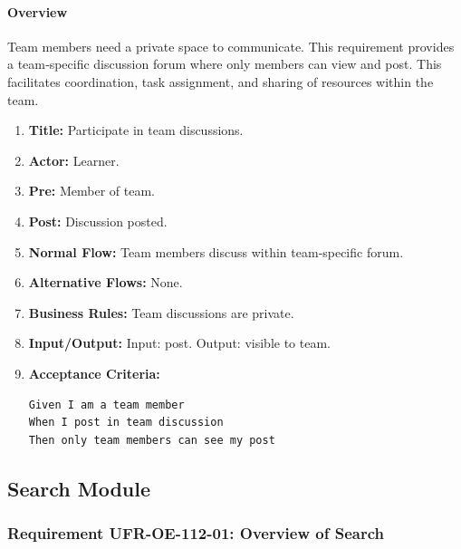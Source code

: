 \paragraph{Overview}
Team members need a private space to communicate. This requirement provides a team‑specific discussion forum where only members can view and post. This facilitates coordination, task assignment, and sharing of resources within the team.
\begin{enumerate}[label=\textbf{\arabic*.}]
\item \textbf{Title:} Participate in team discussions.
\item \textbf{Actor:} Learner.
\item \textbf{Pre:} Member of team.
\item \textbf{Post:} Discussion posted.
\item \textbf{Normal Flow:} Team members discuss within team‑specific forum.
\item \textbf{Alternative Flows:} None.
\item \textbf{Business Rules:} Team discussions are private.
\item \textbf{Input/Output:} Input: post. Output: visible to team.
\item \textbf{Acceptance Criteria:}
    \begin{verbatim}
Given I am a team member
When I post in team discussion
Then only team members can see my post
    \end{verbatim}
\end{enumerate}

\subsection{Search Module}
\subsubsection{Requirement UFR-OE-112-01: Overview of Search}
